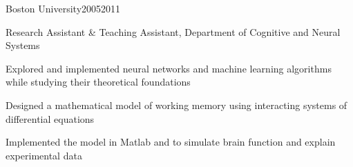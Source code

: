 \documentclass{report}
\begin{document}

  \begin{work_location}{Boston University}{2005}{2011}

    \begin{position}{Research Assistant \& Teaching Assistant, Department of Cognitive and Neural Systems}
      \item Explored and implemented neural networks and machine learning algorithms while studying their theoretical foundations
      \item Designed a mathematical model of working memory using interacting systems of differential equations
      \item Implemented the model in Matlab and \CC{} to simulate brain function and explain experimental data
    \end{position}

  \end{work_location}








\end{document}
